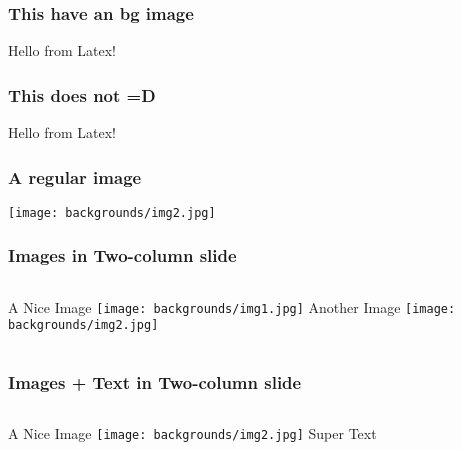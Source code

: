 \documentclass[aspectratio=169,table,xcdraw,18pt,portugues]{beamer}
\begin{document}
{
\begin{frame}
    \frametitle{This have an bg image}
    Hello from Latex!
\end{frame}
}


\begin{frame}
    \frametitle{This does not =D}
    Hello from Latex!
\end{frame}


\begin{frame}
    \frametitle{A regular image}
    \centering
    \texttt{[image: backgrounds/img2.jpg]}
\end{frame}


\begin{frame}
    \frametitle{Images in Two-column slide}
    \begin{columns}[t]
        \centering
        \Large{A Nice Image}\newline\newline
        \texttt{[image: backgrounds/img1.jpg]}
        \centering
        \Large{Another Image}\newline\newline
        \texttt{[image: backgrounds/img2.jpg]}
    \end{columns}
\end{frame}


\begin{frame}
    \frametitle{Images + Text in Two-column slide}
    \begin{columns}[t]
        \centering
        \Large{A Nice Image}\newline\newline
        \texttt{[image: backgrounds/img2.jpg]}
        \centering
        \Large{Super Text}\newline\newline
        \small{\lipsum[1][1-3]}
    \end{columns}
\end{frame}
\end{document}
